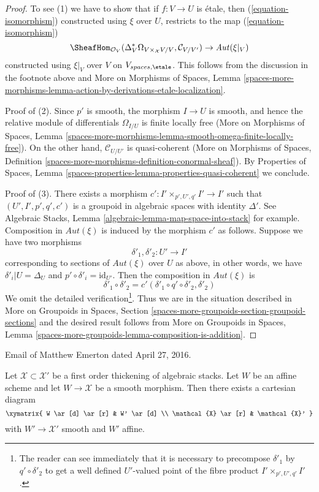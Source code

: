 \begin{proof}
\medskip\noindent
To see (1) we have to show that if $f : V \to U$ is \'etale,
then (\ref{equation-isomorphism}) constructed using $\xi$ over $U$,
restricts to the map (\ref{equation-isomorphism})
$$
\SheafHom_{\mathcal{O}_V}(
\Delta_V^*\Omega_{V \times_\mathcal{X} V/V}, \mathcal{C}_{V/V'}) \to
\mathit{Aut}(\xi|_V)
$$
constructed using $\xi|_V$ over $V$ on $V_{spaces, \etale}$.
This follows from the discussion in the footnote above
and More on Morphisms of Spaces, Lemma
\ref{spaces-more-morphisms-lemma-action-by-derivations-etale-localization}.

\medskip\noindent
Proof of (2). Since $p'$ is smooth, the morphism $I \to U$ is smooth,
and hence the relative module of differentials $\Omega_{I/U}$
is finite locally free (More on Morphisms of Spaces, Lemma
\ref{spaces-more-morphisms-lemma-smooth-omega-finite-locally-free}).
On the other hand, $\mathcal{C}_{U/U'}$ is quasi-coherent
(More on Morphisms of Spaces, Definition
\ref{spaces-more-morphisms-definition-conormal-sheaf}).
By Properties of Spaces, Lemma
\ref{spaces-properties-lemma-properties-quasi-coherent}
we conclude.

\medskip\noindent
Proof of (3). There exists a morphism $c' : I' \times_{p', U', q'} I' \to I'$
such that $(U', I', p', q', c')$ is a groupoid in algebraic spaces
with identity $\Delta'$. See
Algebraic Stacks, Lemma \ref{algebraic-lemma-map-space-into-stack} for example.
Composition in $\mathit{Aut}(\xi)$ is induced by the morphism
$c'$ as follows. Suppose we have two morphisms
$$
\delta'_1, \delta'_2 : U' \longrightarrow I'
$$
corresponding to sections of $\mathit{Aut}(\xi)$ over $U$ as above,
in other words, we have $\delta'_i|U = \Delta_U$ and
$p' \circ \delta'_i = \text{id}_{U'}$. Then the composition
in $\mathit{Aut}(\xi)$ is
$$
\delta'_1 \circ \delta'_2 = c'(\delta'_1 \circ q' \circ \delta'_2, \delta'_2)
$$
We omit the detailed verification\footnote{The reader can see immediately
that it is necessary to precompose
$\delta'_1$ by $q' \circ \delta'_2$ to get a well defined $U'$-valued
point of the fibre product $I' \times_{p', U', q'} I'$.}.
Thus we are in the situation described in
More on Groupoids in Spaces, Section
\ref{spaces-more-groupoids-section-groupoid-sections}
and the desired result follows from
More on Groupoids in Spaces, Lemma
\ref{spaces-more-groupoids-lemma-composition-is-addition}.
\end{proof}

\begin{proposition}[Emerton]
\label{proposition-affine-smooth-lift-to-first-order}
\begin{reference}
Email of Matthew Emerton dated April 27, 2016.
\end{reference}
Let $\mathcal{X} \subset \mathcal{X}'$ be a first order thickening
of algebraic stacks. Let $W$ be an affine scheme and let
$W \to \mathcal{X}$ be a smooth morphism. Then there exists
a cartesian diagram
$$
\xymatrix{
W \ar[d] \ar[r] & W' \ar[d] \\
\mathcal{X} \ar[r] & \mathcal{X}'
}
$$
with $W' \to \mathcal{X}'$ smooth and $W'$ affine.
\end{proposition}

